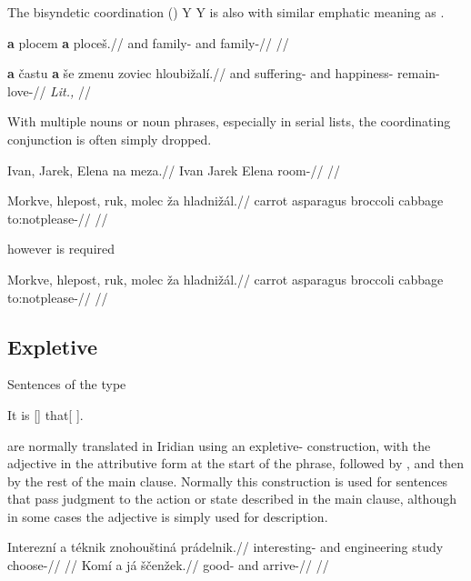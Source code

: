 The bisyndetic coordination (\cite{velupillai2012})  Y  Y is also with similar emphatic meaning as .

\pex
\begingl
    \gla \textbf{a} plocem \textbf{a} ploce\v{s}.//
    \glb and family- and family-//
    \glft {}//
\endgl
\xe

\pex
\begingl
    \gla \textbf{a} \v{c}astu \textbf{a} \v{s}e zmenu zoviec hloubi\v{z}al\'i.//
    \glb and suffering-\mk{} and  happiness- remain- love-//
    \glft {} \emph{Lit.,} //
\endgl
\xe

With multiple nouns or noun phrases, especially in serial lists, the coordinating conjunction is often simply dropped.

\pex
\begingl
    \gla Ivan, Jarek, Elena na meza.//
    \glb Ivan Jarek Elena  room-//
    \glft {}//
\endgl
\xe

\pex
\begingl
    \gla Morkve, hlepost, ruk, molec \v{z}a hladni\v{z}\'al.//
    \glb carrot asparagus broccoli cabbage  to:notplease-//
    \glft {}//
\endgl
\xe

 however is required

\pex
\begingl
    \gla Morkve, hlepost, ruk, molec \v{z}a hladni\v{z}\'al.//
    \glb carrot asparagus broccoli cabbage  to:notplease-//
    \glft {}//
\endgl
\xe

\subsection{Expletive }
Sentences of the type

\ex
It is [] that[ ].
\xe

are normally translated in Iridian using an expletive- construction, with the adjective in the attributive form at the start of the phrase, followed by , and then by the rest of the main clause. Normally this construction is used for sentences that pass judgment to the action or state described in the main clause, although in some cases the adjective is simply used for description.

\pex
\a\begingl
    \gla Interezn\'i a t\'eknik znohou\v{s}tin\'a pr\'adelnik.//
    \glb interesting- and engineering study choose-//
    \glft {}//
\endgl
\xe
\pex
\a\begingl
    \gla Kom\'i a j\'a \v{s}\v{c}en\v{z}ek.//
    \glb good- and  arrive-//
    \glft {}//
\endgl
\xe

